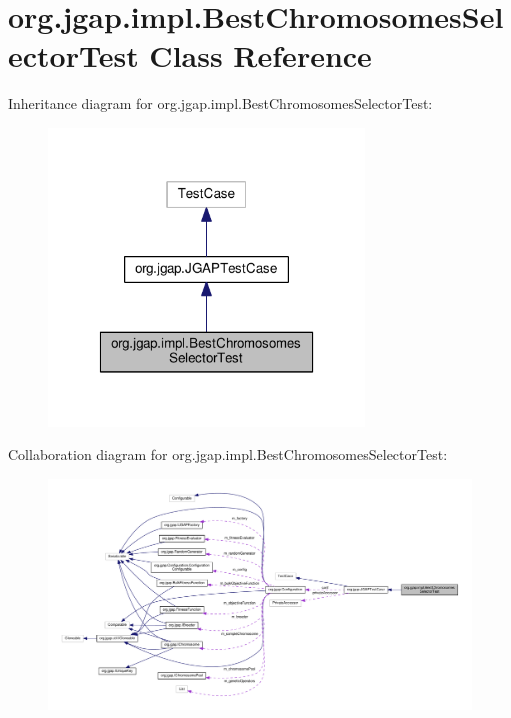 \hypertarget{classorg_1_1jgap_1_1impl_1_1_best_chromosomes_selector_test}{\section{org.\-jgap.\-impl.\-Best\-Chromosomes\-Selector\-Test Class Reference}
\label{classorg_1_1jgap_1_1impl_1_1_best_chromosomes_selector_test}
}


Inheritance diagram for org.\-jgap.\-impl.\-Best\-Chromosomes\-Selector\-Test\-:
\nopagebreak
\begin{figure}[H]
\begin{center}
\leavevmode
\includegraphics[width=238pt]{classorg_1_1jgap_1_1impl_1_1_best_chromosomes_selector_test__inherit__graph}
\end{center}
\end{figure}


Collaboration diagram for org.\-jgap.\-impl.\-Best\-Chromosomes\-Selector\-Test\-:
\nopagebreak
\begin{figure}[H]
\begin{center}
\leavevmode
\includegraphics[width=350pt]{classorg_1_1jgap_1_1impl_1_1_best_chromosomes_selector_test__coll__graph}
\end{center}
\end{figure}
